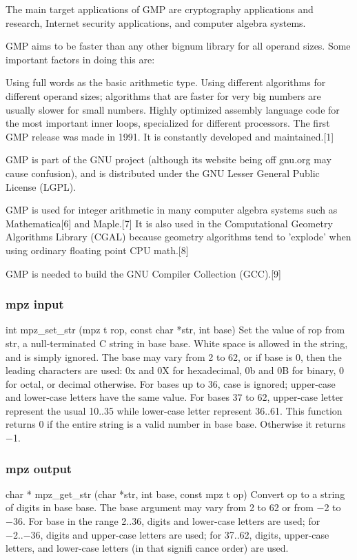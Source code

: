 The main target applications of GMP are cryptography applications and research, Internet security applications, and computer algebra systems.

GMP aims to be faster than any other bignum library for all operand sizes. Some important factors in doing this are:

Using full words as the basic arithmetic type.
Using different algorithms for different operand sizes; algorithms that are faster for very big numbers are usually slower for small numbers.
Highly optimized assembly language code for the most important inner loops, specialized for different processors.
The first GMP release was made in 1991. It is constantly developed and maintained.[1]

GMP is part of the GNU project (although its website being off gnu.org may cause confusion), and is distributed under the GNU Lesser General Public License (LGPL).

GMP is used for integer arithmetic in many computer algebra systems such as Mathematica[6] and Maple.[7] It is also used in the Computational Geometry Algorithms Library (CGAL) because geometry algorithms tend to 'explode' when using ordinary floating point CPU math.[8]

GMP is needed to build the GNU Compiler Collection (GCC).[9]



\subsubsection{mpz input}

int mpz\_set\_str (mpz t rop, const char *str, int base)
Set the value of rop from str, a null-terminated C string in base base. White space is allowed
in the string, and is simply ignored.
The base may vary from 2 to 62, or if base is 0, then the leading characters are used: 0x and
0X for hexadecimal, 0b and 0B for binary, 0 for octal, or decimal otherwise.
For bases up to 36, case is ignored; upper-case and lower-case letters have the same value. For
bases 37 to 62, upper-case letter represent the usual 10..35 while lower-case letter represent
36..61.
This function returns 0 if the entire string is a valid number in base base. Otherwise it returns
−1.


\subsubsection{mpz output}

char * mpz\_get\_str (char *str, int base, const mpz t op)
Convert op to a string of digits in base base. The base argument may vary from 2 to 62 or
from −2 to −36.
For base in the range 2..36, digits and lower-case letters are used; for −2..−36, digits and
upper-case letters are used; for 37..62, digits, upper-case letters, and lower-case letters (in
that signifi cance order) are used.

